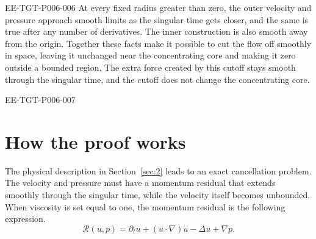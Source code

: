 \begin{EESegment}{EE-TGT-P006-006}
At every fixed radius greater than zero, the outer velocity and pressure approach smooth limits
as the singular time gets closer, and the same is true after any number of derivatives. The
inner construction is also smooth away from the origin. Together these facts make it possible
to cut the flow off smoothly in space, leaving it unchanged near the concentrating core and
making it zero outside a bounded region. The extra force created by this
cutoff stays smooth through the singular time, and the cutoff does not change the concentrating
core.
\end{EESegment}

\begin{EESegment}{EE-TGT-P006-007}
\section{How the proof works}\label{sec:3}

The physical description in Section~\ref{sec:2} leads to an exact cancellation problem. The
velocity and pressure must have a momentum residual that extends smoothly through the singular
time, while the velocity itself becomes unbounded. When viscosity is set equal to one, the
momentum residual is the following expression.
\begin{equation}
  \mathscr R(u,p)=\partial_tu+(u\cdot\nabla)u-\Delta u+\nabla p.
  \tag{3.1}\label{eq:3.1}
\end{equation}
\end{EESegment}
